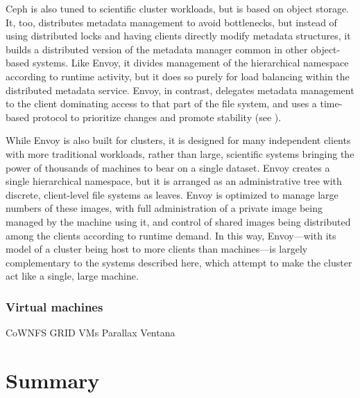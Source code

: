 Ceph \cite{weil} is also tuned to scientific cluster workloads, but is based on object storage. It, too, distributes metadata management to avoid bottlenecks, but instead of using distributed locks and having clients directly modify metadata structures, it builds a distributed version of the metadata manager common in other object-based systems. Like Envoy, it divides management of the hierarchical namespace according to runtime activity, but it does so purely for load balancing within the distributed metadata service. Envoy, in contrast, delegates metadata management to the client dominating access to that part of the file system, and uses a time-based protocol to prioritize changes and promote stability (see ).

While Envoy is also built for clusters, it is designed for many independent clients with more traditional workloads, rather than large, scientific systems bringing the power of thousands of machines to bear on a single dataset. Envoy creates a single hierarchical namespace, but it is arranged as an administrative tree with discrete, client-level file systems as leaves. Envoy is optimized to manage large numbers of these images, with full administration of a private image being managed by the machine using it, and control of shared images being distributed among the clients according to runtime demand. In this way, Envoy---with its model of a cluster being host to more clients than machines---is largely complementary to the systems described here, which attempt to make the cluster act like a single, large machine.

\subsubsection{Virtual machines}

CoWNFS \cite{kotsovinos04b}
GRID VMs \cite{zhao04}
Parallax \cite{warfield}
Ventana \cite{pfaff}


\section{Summary}
